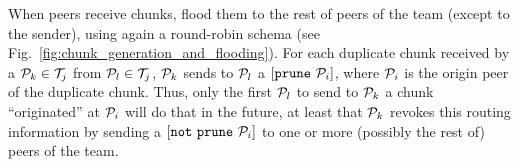 When peers receive chunks, flood them to the rest of peers of the team
(except to the sender), using again a round-robin schema (see
Fig.~\ref{fig:chunk_generation_and_flooding}). For each duplicate
chunk received by a ${\cal P}_k \in {\cal T}_j$ from ${\cal P}_l \in
{\cal T}_j$, ${\cal P}_k$ sends to ${\cal P}_l$ a
$[\mathtt{prune}~{\cal P}_i]$, where ${\cal P}_i$ is the origin peer
of the duplicate chunk. Thus, only the first ${\cal P}_l$ to send to
${\cal P}_k$ a chunk ``originated'' at ${\cal P}_i$ will do that in
the future, at least that ${\cal P}_k$ revokes this routing
information by sending a $[\mathtt{not~prune}~{\cal P}_i]$ to one or
more (possibly the rest of) peers of the team.

